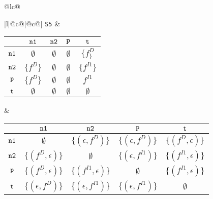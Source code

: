 \documentclass[runningheads,a4paper]{llncs}
\newcommand{\p}{\mbox{\tt p}}
\newcommand{\nO}{\mbox{\tt n1}}
\newcommand{\nT}{\mbox{\tt n2}}
\newcommand{\myt}{\mbox{\tt t}}
\newcommand{\drct}{\ensuremath{D}}
\newcommand{\indrct}{\ensuremath{I}}
\newcommand{\fieldD}[2]{\ensuremath{{#1}_{#2}^\drct}}
\newcommand{\fieldI}[3]{\ensuremath{{#1}_{#2}^{\indrct#3}}}
\begin{document}
\begin{figure}[t]
\begin{tabular}{@{}lc@{}}
{\begin{tabular}[b]{|l|@{}c@{}|@{}c@{}|}
{\tt S5} & 
\begin{tabular}{|c|cccc|} \hline
            & $\nO$  								& $\nT$ 				& $\p$ 			& $\myt$ \\ \hline
  $\nO$ 	& $\emptyset$							& $\emptyset$			& $\emptyset$	& $\{\fieldD{f}\}$ \\ \hline
  $\nT$ 	& $\{\fieldD{f}{}\}$					& $\emptyset$			& $\emptyset$	& $\{\fieldI{f}{}{1}\}$ \\ \hline
  $\p$ 		& $\{\fieldD{f}{}\}$					& $\emptyset$			& $\emptyset$	& $\fieldI{f}{}{1}$ \\ \hline
  $\myt$ 	& $\emptyset$							& $\emptyset$			& $\emptyset$	& $\emptyset$ \\ \hline
\end{tabular}
 &
\begin{tabular}{|c|cccc|} \hline
			& $\nO$  							& $\nT$ 							& $\p$ 			& $\myt$ \\ \hline
  $\nO$ 	& $\emptyset$						& $\{(\epsilon, \fieldD{f}{})\}$	& $\{(\epsilon, \fieldD{f}{})\}$	& $\{(\fieldD{f}{},\epsilon)\}$ \\ \hline
  $\nT$ 	& $\{(\fieldD{f}{}, \epsilon)\}$	& $\emptyset$						& $\{(\epsilon, \fieldI{f}{}{1})\}$	& $\{(\fieldI{f}{}{1}, \epsilon)\}$ \\ \hline
  $\p$ 		& $\{(\fieldD{f}{}, \epsilon)\}$	& $\{(\fieldI{f}{}{1}, \epsilon)\}$	& $\emptyset$	& $\{(\fieldI{f}{}{1}, \epsilon)\}$ \\ \hline
  $\myt$ 	& $\{(\epsilon, \fieldD{f}{})\}$		& $\{(\epsilon, \fieldI{f}{}{1})\}$		& $\{(\epsilon, \fieldI{f}{}{1})\}$	& $\emptyset$ \\ \hline
\end{tabular} \\ \hline


\end{tabular}}
\end{tabular}
\end{figure}
\end{document}
